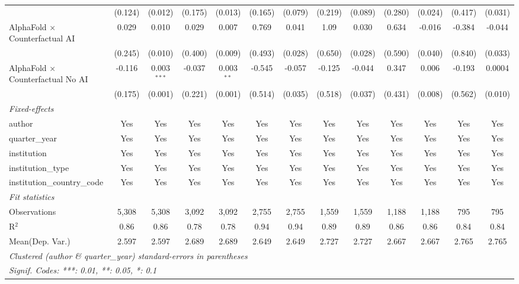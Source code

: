 \begin{tabular}{lcccccccccccc}
                                            & (0.124) & (0.012)        & (0.175) & (0.013)        & (0.165) & (0.079) & (0.219) & (0.089) & (0.280) & (0.024)      & (0.417) & (0.031)\\   
   AlphaFold $\times$ Counterfactual AI     & 0.029   & 0.010          & 0.029   & 0.007          & 0.769   & 0.041   & 1.09    & 0.030   & 0.634   & -0.016       & -0.384  & -0.044\\   
                                            & (0.245) & (0.010)        & (0.400) & (0.009)        & (0.493) & (0.028) & (0.650) & (0.028) & (0.590) & (0.040)      & (0.840) & (0.033)\\   
   AlphaFold $\times$ Counterfactual No AI  & -0.116  & 0.003$^{***}$  & -0.037  & 0.003$^{**}$   & -0.545  & -0.057  & -0.125  & -0.044  & 0.347   & 0.006        & -0.193  & 0.0004\\   
                                            & (0.175) & (0.001)        & (0.221) & (0.001)        & (0.514) & (0.035) & (0.518) & (0.037) & (0.431) & (0.008)      & (0.562) & (0.010)\\   
   \midrule
   \emph{Fixed-effects}\\
   author                                   & Yes     & Yes            & Yes     & Yes            & Yes     & Yes     & Yes     & Yes     & Yes     & Yes          & Yes     & Yes\\  
   quarter\_year                            & Yes     & Yes            & Yes     & Yes            & Yes     & Yes     & Yes     & Yes     & Yes     & Yes          & Yes     & Yes\\  
   institution                              & Yes     & Yes            & Yes     & Yes            & Yes     & Yes     & Yes     & Yes     & Yes     & Yes          & Yes     & Yes\\  
   institution\_type                        & Yes     & Yes            & Yes     & Yes            & Yes     & Yes     & Yes     & Yes     & Yes     & Yes          & Yes     & Yes\\  
   institution\_country\_code               & Yes     & Yes            & Yes     & Yes            & Yes     & Yes     & Yes     & Yes     & Yes     & Yes          & Yes     & Yes\\  
   \midrule
   \emph{Fit statistics}\\
   Observations                             & 5,308   & 5,308          & 3,092   & 3,092          & 2,755   & 2,755   & 1,559   & 1,559   & 1,188   & 1,188        & 795     & 795\\  
   R$^2$                                    & 0.86    & 0.86           & 0.78    & 0.78           & 0.94    & 0.94    & 0.89    & 0.89    & 0.86    & 0.86         & 0.84    & 0.84\\  
Mean(Dep. Var.) & 2.597 & 2.597 & 2.689 & 2.689 & 2.649 & 2.649 & 2.727 & 2.727 & 2.667 & 2.667 & 2.765 & 2.765 \\
   \midrule \midrule
   \multicolumn{13}{l}{\emph{Clustered (author \& quarter\_year) standard-errors in parentheses}}\\
   \multicolumn{13}{l}{\emph{Signif. Codes: ***: 0.01, **: 0.05, *: 0.1}}\\
\end{tabular}
\par\endgroup
